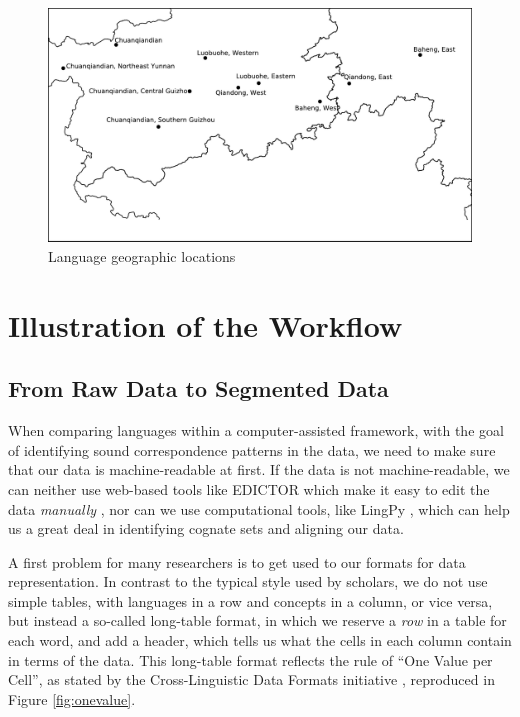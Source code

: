\documentclass[xetex,svgnames]{scrartcl}
\begin{document}
\begin{figure}[htb]
  \centering
  \includegraphics[width=\textwidth]{Geographic.pdf}
  \caption{Language geographic locations}
  \label{fig:geo}
\end{figure}

\section{Illustration of the Workflow}\label{sec:wf}
\subsection{From Raw Data to Segmented Data}
When comparing languages within a computer-assisted framework, with the goal of identifying sound
correspondence patterns in the data, we need to make sure that our data is machine-readable at
first. If the data is not machine-readable, we can neither use web-based tools like EDICTOR which
make it easy to edit the data \emph{manually} \citep{List2017d}, nor can we use computational tools,
like LingPy \citep{List2018i}, which can help us a great deal in identifying cognate sets and
aligning our data.

A first problem for many researchers is to get used to our formats for data representation.
In contrast to the typical style used by scholars, we do not use simple tables, with languages in a
row and concepts in a column, or vice versa, but instead a so-called long-table format, in which we
reserve a \emph{row} in a table for each word, and add a header, which tells us what the cells in
each column contain in terms of the data. This long-table format reflects the rule of
``One Value per Cell'', as stated by the Cross-Linguistic Data Formats initiative
\citep{Forkel2018a}, reproduced in Figure \ref{fig:onevalue}.
\end{document}
